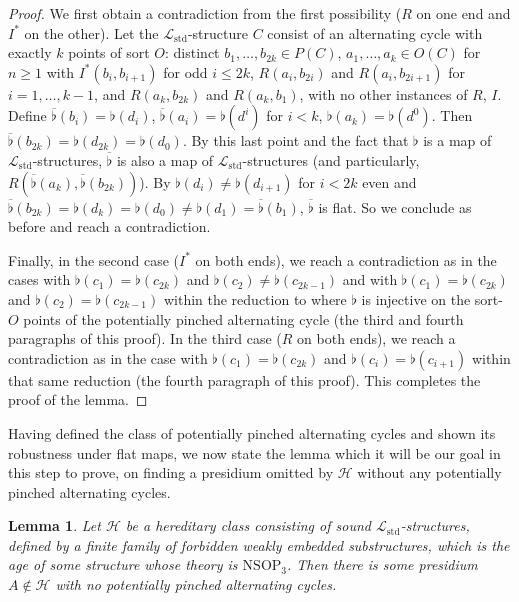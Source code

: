 \documentclass{amsart}
\newtheorem{lemma}[theorem]{Lemma}
\theoremstyle{definition}
\theoremstyle{remark}
\numberwithin{equation}{section}
\begin{document}
\begin{proof}
    We first obtain a contradiction from the first possibility ($R$ on one end and $I^{*}$ on the other). Let the $\mathcal{L}_{\mathrm{std}}$-structure $C$ consist of an alternating cycle with exactly $k$ points of sort $O$: distinct $b_{1}, \ldots, b_{2k} \in P(C)$, $a_1, \ldots, a_k \in O(C)$ for $n \geq 1$ with $I^{*}(b_i, b_{i+1} )$ for odd $i \leq 2k$, $R(a_i, b_{2i})$ and $R(a_i, b_{2i+1})$ for $i= 1, \ldots, k-1$, and $R(a_k, b_{2k})$ and $R(a_k, b_{1})$, with no other instances of $R$, $I$. Define $\overline{\flat}(b_i)=\flat(d_{i})$, $\overline{\flat}(a_{i})=\flat(d^{i})$ for $i < k$, $\flat(a_k)=\flat(d^0)$. Then $\overline{\flat}(b_{2k})=\flat(d_{2k})=\flat(d_{0})$. By this last point and the fact that $\flat$ is a map of $\mathcal{L}_{\mathrm{std}}$-structures, $\overline{\flat}$ is also a map of $\mathcal{L}_{\mathrm{std}}$-structures (and particularly, $R(\overline{\flat}(a_{k}), \overline{\flat}(b_{2k}))$). By $\flat(d_{i}) \neq \flat(d_{i+1}) $ for $i < 2k$ even and $\overline{\flat}(b_{2k})=\flat(d_{k})=\flat(d_{0}) \neq \flat(d_1) = \overline{\flat}(b_1)$, $\overline{\flat}$ is flat. So we conclude as before and reach a contradiction.

Finally, in the second case ($I^{*}$ on both ends), we reach a contradiction as in the cases with $\flat(c_1) = \flat(c_{2k})$ and $\flat(c_{2}) \neq \flat(c_{2k-1}) $ and with $\flat(c_1) = \flat(c_{2k})$ and $\flat(c_{2}) = \flat(c_{2k-1}) $ within the reduction to where $\flat$ is injective on the sort-$O$ points of the potentially pinched alternating cycle (the third and fourth paragraphs of this proof). In the third case ($R$ on both ends), we reach a contradiction as in the case with $\flat(c_1) = \flat(c_{2k})$ and $\flat(c_i) = \flat(c_{i+1}) $ within that same reduction (the fourth paragraph of this proof). This completes the proof of the lemma.
    
\end{proof}

Having defined the class of potentially pinched alternating cycles and shown its robustness under flat maps, we now state the lemma which it will be our goal in this step to prove, on finding a presidium omitted by $\mathcal{H}$ without any potentially pinched alternating cycles.


\begin{lemma}
 \label{eliminating potentially pinched alternating cycles}   Let $\mathcal{H}$ be a hereditary class consisting of sound $\mathcal{L}_{\mathrm{std}}$-structures, defined by a finite family of forbidden weakly embedded substructures, which is the age of some structure whose theory is $\mathrm{NSOP}_{3}$. Then there is some presidium $A \notin \mathcal{H}$ with no potentially pinched alternating cycles.
\end{lemma}
\end{document}
